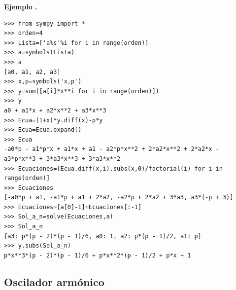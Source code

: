 \documentclass{article}
\newcounter{ejemplo_cont}
\newenvironment{ejemplo}{\noindent\textbf{Ejemplo  \arabic{ejemplo_cont}.} }{\addtocounter{ejemplo_cont}{1}}
\begin{document}
\begin{ejemplo}
\begin{lstlisting}
>>> from sympy import *
>>> orden=4
>>> Lista=['a%s'%i for i in range(orden)]
>>> a=symbols(Lista)
>>> a
[a0, a1, a2, a3]
>>> x,p=symbols('x,p')
>>> y=sum([a[i]*x**i for i in range(orden)])
>>> y
a0 + a1*x + a2*x**2 + a3*x**3
>>> Ecua=(1+x)*y.diff(x)-p*y
>>> Ecua=Ecua.expand()
>>> Ecua
-a0*p - a1*p*x + a1*x + a1 - a2*p*x**2 + 2*a2*x**2 + 2*a2*x - a3*p*x**3 + 3*a3*x**3 + 3*a3*x**2
>>> Ecuaciones=[Ecua.diff(x,i).subs(x,0)/factorial(i) for i in range(orden)]
>>> Ecuaciones
[-a0*p + a1, -a1*p + a1 + 2*a2, -a2*p + 2*a2 + 3*a3, a3*(-p + 3)]
>>> Ecuaciones=[a[0]-1]+Ecuaciones[:-1]
>>> Sol_a_n=solve(Ecuaciones,a)
>>> Sol_a_n
{a3: p*(p - 2)*(p - 1)/6, a0: 1, a2: p*(p - 1)/2, a1: p}
>>> y.subs(Sol_a_n)
p*x**3*(p - 2)*(p - 1)/6 + p*x**2*(p - 1)/2 + p*x + 1
\end{lstlisting}




\end{ejemplo}

\subsection{Oscilador armónico}
\end{document}
